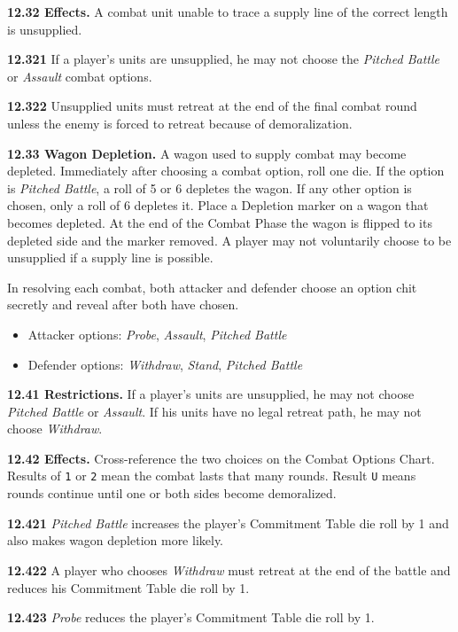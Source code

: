 \textbf{12.32 Effects.} A combat unit unable to trace a supply line of the correct length is unsupplied.

\textbf{12.321} If a player's units are unsupplied, he may not choose the \textit{Pitched Battle} or \textit{Assault} combat options.

\textbf{12.322} Unsupplied units must retreat at the end of the final combat round unless the enemy is forced to retreat because of demoralization.

\textbf{12.33 Wagon Depletion.} A wagon used to supply combat may become depleted. Immediately after choosing a combat option, roll one die. If the option is \textit{Pitched Battle}, a roll of 5 or 6 depletes the wagon. If any other option is chosen, only a roll of 6 depletes it. Place a Depletion marker on a wagon that becomes depleted. At the end of the Combat Phase the wagon is flipped to its depleted side and the marker removed. A player may not voluntarily choose to be unsupplied if a supply line is possible.


In resolving each combat, both attacker and defender choose an option chit secretly and reveal after both have chosen.

\begin{itemize}
\item Attacker options: \textit{Probe}, \textit{Assault}, \textit{Pitched Battle}
\item Defender options: \textit{Withdraw}, \textit{Stand}, \textit{Pitched Battle}
\end{itemize}

\textbf{12.41 Restrictions.} If a player's units are unsupplied, he may not choose \textit{Pitched Battle} or \textit{Assault}. If his units have no legal retreat path, he may not choose \textit{Withdraw}.

\textbf{12.42 Effects.} Cross-reference the two choices on the Combat Options Chart. Results of \texttt{1} or \texttt{2} mean the combat lasts that many rounds. Result \texttt{U} means rounds continue until one or both sides become demoralized.

\textbf{12.421} \textit{Pitched Battle} increases the player's Commitment Table die roll by 1 and also makes wagon depletion more likely.

\textbf{12.422} A player who chooses \textit{Withdraw} must retreat at the end of the battle and reduces his Commitment Table die roll by 1.

\textbf{12.423} \textit{Probe} reduces the player's Commitment Table die roll by 1.

